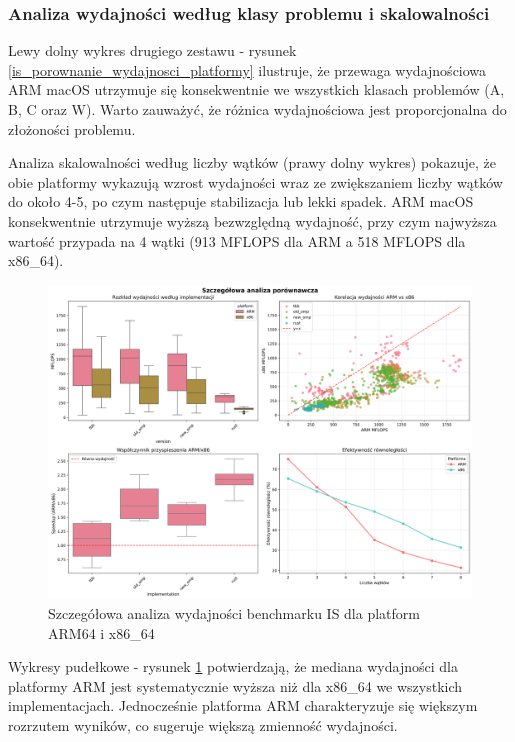 \subsubsection{Analiza wydajności według klasy problemu i skalowalności}
Lewy dolny wykres drugiego zestawu - rysunek \ref{is_porownanie_wydajnosci_platformy} ilustruje, że przewaga wydajnościowa ARM macOS utrzymuje się konsekwentnie we wszystkich klasach problemów (A, B, C oraz W). Warto zauważyć, że różnica wydajnościowa jest proporcjonalna do złożoności problemu.

Analiza skalowalności według liczby wątków (prawy dolny wykres) pokazuje, że obie platformy wykazują wzrost wydajności wraz ze zwiększaniem liczby wątków do około 4-5, po czym następuje stabilizacja lub lekki spadek. ARM macOS konsekwentnie utrzymuje wyższą bezwzględną wydajność, przy czym najwyższa wartość przypada na 4 wątki (913 MFLOPS dla ARM a 518 MFLOPS dla x86\_64).

\begin{figure}[H]
    \centering
    \includegraphics[width=\textwidth]{analiza/images/parallel/is/compare/is_szczegolowa_analiza_wydajnosci.png}
    \caption{Szczegółowa analiza wydajności benchmarku IS dla platform ARM64 i x86\_64}
    \label{is_szczegolowa_analiza_wydajnosci}
\end{figure}
Wykresy pudełkowe - rysunek \ref{is_szczegolowa_analiza_wydajnosci} potwierdzają, że mediana wydajności dla platformy ARM jest systematycznie wyższa niż dla x86\_64 we wszystkich implementacjach. Jednocześnie platforma ARM charakteryzuje się większym rozrzutem wyników, co sugeruje większą zmienność wydajności.

